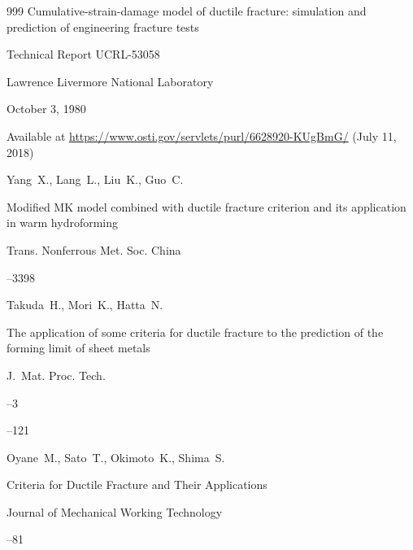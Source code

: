 \begin{thebibliography}{999}
\thesis Cumulative-strain-damage model of ductile fracture: simulation and prediction of engineering fracture tests

\thesisinfo Technical Report UCRL-53058

\publaddr Lawrence Livermore National Laboratory

\yr October 3, 1980

\elink Available at \url{https://www.osti.gov/servlets/purl/6628920-KUgBmG/} (July 11, 2018)








\by Yang~X., Lang~L., Liu~K., Guo~C. 

\paper Modified MK model combined with ductile fracture criterion and its application in warm hydroforming

\jour Trans. Nonferrous Met. Soc. China




--3398





\by Takuda~H., Mori~K., Hatta~N.  

\paper The application of some criteria for ductile fracture to the prediction of the forming limit of sheet metals

\jour J.~Mat. Proc. Tech.



--3

–121







\by Oyane~M., Sato~T., Okimoto~K., Shima~S. 

\paper Criteria for Ductile Fracture and Their Applications

\jour Journal of Mechanical Working Technology




–81


\end{thebibliography}
